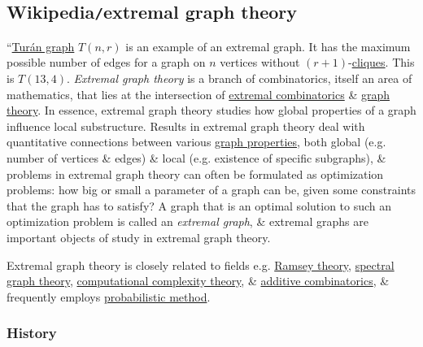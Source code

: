 \documentclass{article}
\begin{document}

\subsection{Wikipedia{\tt/}extremal graph theory}
``{\sf\href{https://en.wikipedia.org/wiki/Tur%C3%A1n_graph}{Tur\'an graph} $T(n,r)$ is an example of an extremal graph. It has the maximum possible number of edges for a graph on $n$ vertices without $(r + 1)$-\href{https://en.wikipedia.org/wiki/Clique_(graph_theory)}{cliques}. This is $T(13,4)$.} {\it Extremal graph theory} is a branch of combinatorics, itself an area of mathematics, that lies at the intersection of \href{https://en.wikipedia.org/wiki/Extremal_combinatorics}{extremal combinatorics} \& \href{https://en.wikipedia.org/wiki/Graph_theory}{graph theory}. In essence, extremal graph theory studies how global properties of a graph influence local substructure. Results in extremal graph theory deal with quantitative connections between various \href{https://en.wikipedia.org/wiki/Graph_property}{graph properties}, both global (e.g. number of vertices \& edges) \& local (e.g. existence of specific subgraphs), \& problems in extremal graph theory can often be formulated as optimization problems: how big or small a parameter of a graph can be, given some constraints that the graph has to satisfy? A graph that is an optimal solution to such an optimization problem is called an {\it extremal graph}, \& extremal graphs are important objects of study in extremal graph theory.

Extremal graph theory is closely related to fields e.g. \href{https://en.wikipedia.org/wiki/Ramsey_theory}{Ramsey theory}, \href{https://en.wikipedia.org/wiki/Spectral_graph_theory}{spectral graph theory}, \href{https://en.wikipedia.org/wiki/Computational_complexity_theory}{computational complexity theory}, \& \href{https://en.wikipedia.org/wiki/Additive_combinatorics}{additive combinatorics}, \& frequently employs \href{https://en.wikipedia.org/wiki/Probabilistic_method}{probabilistic method}.

\subsubsection{History}
\end{document}
